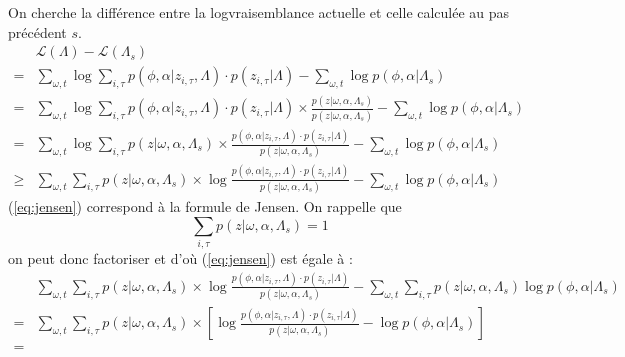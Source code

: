 \documentclass[a4paper,12pt]{article}
\begin{document}
On cherche la différence entre la logvraisemblance actuelle et celle calculée au pas précédent $s$.
\begin{align}
& \mathcal{L}(\Lambda) - \mathcal{L}(\Lambda_s) & \nonumber \\
= & \displaystyle\sum_{\omega,t} \log \displaystyle\sum_{i, \tau} p(\phi, \alpha | z_{i, \tau}, \Lambda) \cdot p(z_{i, \tau} | \Lambda) - \displaystyle\sum_{\omega,t} \log p(\phi, \alpha | \Lambda_s) \nonumber\\
= & \displaystyle\sum_{\omega,t} \log \displaystyle\sum_{i, \tau} p(\phi, \alpha | z_{i, \tau}, \Lambda) \cdot p(z_{i, \tau} | \Lambda) \times \frac{p(z|\omega,\alpha,\Lambda_s)}{p(z|\omega,\alpha,\Lambda_s)}- \displaystyle\sum_{\omega,t} \log p(\phi, \alpha | \Lambda_s) \nonumber\\
= & \displaystyle\sum_{\omega,t} \log \displaystyle\sum_{i, \tau} p(z|\omega,\alpha,\Lambda_s) \times \frac{p(\phi, \alpha | z_{i, \tau}, \Lambda) \cdot p(z_{i, \tau} | \Lambda)}{p(z|\omega,\alpha,\Lambda_s)}- \displaystyle\sum_{\omega,t} \log p(\phi, \alpha | \Lambda_s) \nonumber\\
\geq & \displaystyle\sum_{\omega,t} \displaystyle\sum_{i, \tau} p(z|\omega,\alpha,\Lambda_s) \times \log \frac{p(\phi, \alpha | z_{i, \tau}, \Lambda) \cdot p(z_{i, \tau} | \Lambda)}{p(z|\omega,\alpha,\Lambda_s)}- \displaystyle\sum_{\omega,t} \log p(\phi, \alpha | \Lambda_s) \label{eq:jensen}
\end{align}
(\ref{eq:jensen}) correspond à la formule de Jensen. On rappelle que
\begin{equation}
\displaystyle \sum_{i,\tau} p(z|\omega,\alpha,\Lambda_s) = 1
\end{equation}
on peut donc factoriser et d'où (\ref{eq:jensen}) est égale à :
\begin{align}
& \displaystyle\sum_{\omega,t} \displaystyle\sum_{i, \tau} p(z|\omega,\alpha,\Lambda_s) \times \log \frac{p(\phi, \alpha | z_{i, \tau}, \Lambda) \cdot p(z_{i, \tau} | \Lambda)}{p(z|\omega,\alpha,\Lambda_s)}- \displaystyle\sum_{\omega,t}\displaystyle\sum_{i, \tau} p(z|\omega,\alpha,\Lambda_s) \log p(\phi, \alpha | \Lambda_s) \nonumber \\
= & \displaystyle\sum_{\omega,t} \displaystyle\sum_{i, \tau} p(z|\omega,\alpha,\Lambda_s) \times [ \log \frac{p(\phi, \alpha | z_{i, \tau}, \Lambda) \cdot p(z_{i, \tau} | \Lambda)}{p(z|\omega,\alpha,\Lambda_s)}-\log p(\phi, \alpha | \Lambda_s) ] \nonumber \\
= & 
\end{align}
\end{document}
